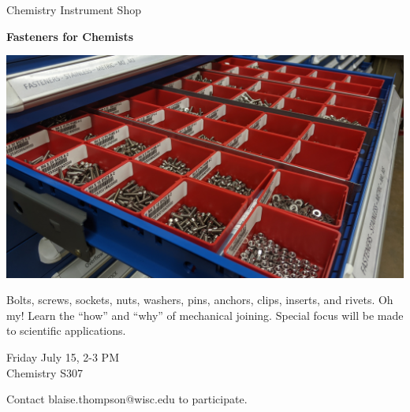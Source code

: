 \documentclass{article}
\begin{document}
\center

\Huge

Chemistry Instrument Shop

\textbf{
Fasteners for Chemists
}

\includegraphics[width=\linewidth]{coverart.jpg}

{
\huge
Bolts, screws, sockets, nuts, washers, pins, anchors, clips, inserts, and rivets.
Oh my!
Learn the ``how'' and ``why'' of mechanical joining.
Special focus will be made to scientific applications.
}

\vfill

{
\huge
Friday July 15, 2-3 PM \\
Chemistry S307
}

\vfill

{
\huge
Contact blaise.thompson@wisc.edu to participate.
}
\end{document}
